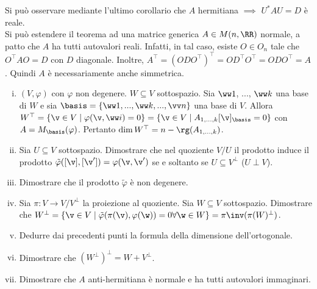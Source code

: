 \documentclass[11pt]{article}
\begin{document}
	\begin{remark}\nl
		\li Si può osservare mediante l'ultimo corollario che $A$ hermitiana
		$\implies$ $U^* A U = D$ è reale. \\
		\li Si può estendere il teorema ad una matrice generica
		$A \in M(n, \RR)$ normale, a patto che $A$ ha tutti autovalori
		reali. Infatti, in tal caso, esiste $O \in O_n$ tale che
		$O^\top A O = D$ con $D$ diagonale. Inoltre, $A^\top = (O D O^\top)^\top
		= O D^\top O^\top = O D O^\top = A$. Quindi $A$ è necessariamente
		anche simmetrica.
	\end{remark}

	\begin{exercise}\nl
		\begin{enumerate}[(i)]
			\item $(V, \varphi)$ con $\varphi$ non degenere.
			$W \subseteq V$ sottospazio. Sia $\ww 1$, ..., $\ww k$
			una base di $W$ e sia $\basis = \{ \ww 1, ..., \ww k, ..., \vv n \}$ una base di $V$. Allora $W^\top = \{ \v \in V \mid \varphi(\v, \ww i) = 0 \} = \{ \v \in V \mid A_{1,\ldots,k} [\v]_\basis = 0 \}$ con $A = M_\basis(\varphi)$. Pertanto $\dim W^\top = n - \rg(A_{1,...,k})$.

			\item Sia $U \subseteq V$ sottospazio. Dimostrare che
			nel quoziente $V/U$ il prodotto induce il prodotto $\tilde \varphi([\v], [\v']) = \varphi(\v, \v')$ se e soltanto se
			$U \subseteq V^\perp$ ($U \perp V$).
			
			\item Dimostrare che il prodotto $\tilde \varphi$ è
			non degenere.
			
			\item Sia $\pi : V \to V/V^\perp$ la proiezione al
			quoziente. Sia $W \subseteq V$ sottospazio. Dimostrare
			che $W^\perp = \{ \v \in V \mid \tilde \varphi(\pi(\v), \varphi(\w)) = 0 \forall \w \in W \} = \pi\inv(\pi(W)^\perp)$.
			
			\item Dedurre dai precedenti punti la formula della dimensione
			dell'ortogonale.
			
			\item Dimostrare che $(W^\perp)^\perp = W + V^\perp$.
			
			\item Dimostrare che $A$ anti-hermitiana è normale e ha tutti autovalori
			immaginari.
		\end{enumerate}
	\end{exercise}
\end{document}
